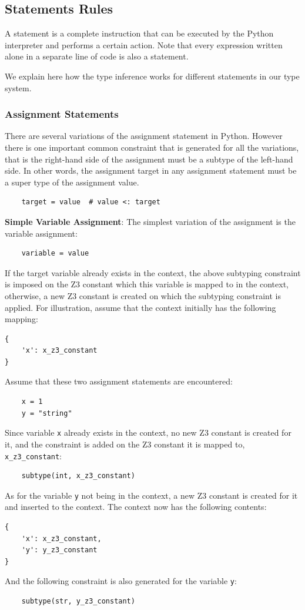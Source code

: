 \subsection{Statements Rules}
A statement is a complete instruction that can be executed by the Python interpreter and performs a certain action. Note that every expression written alone in a separate line of code is also a statement.

We explain here how the type inference works for different statements in our type system.

\subsubsection{Assignment Statements}
There are several variations of the assignment statement in Python. However there is one important common constraint that is generated for all the variations, that is the right-hand side of the assignment must be a subtype of the left-hand side. In other words, the assignment target in any assignment statement must be a super type of the assignment value.

\begin{lstlisting}
	target = value  # value <: target
\end{lstlisting}


\textbf{Simple Variable Assignment}: The simplest variation of the assignment is the variable assignment:
\begin{lstlisting}
	variable = value
\end{lstlisting}
If the target variable already exists in the context, the above subtyping constraint is imposed on the Z3 constant which this variable is mapped to in the context, otherwise, a new Z3 constant is created on which the subtyping constraint is applied. For illustration, assume that the context initially has the following mapping:
\begin{lstlisting}
{
	'x': x_z3_constant
}
\end{lstlisting}
Assume that these two assignment statements are encountered:
\begin{lstlisting}
	x = 1
	y = "string"
\end{lstlisting}
Since variable \lstinline|x| already exists in the context, no new Z3 constant is created for it, and the constraint is added on the Z3 constant it is mapped to, \lstinline|x_z3_constant|:
\begin{lstlisting}
	subtype(int, x_z3_constant)
\end{lstlisting}
As for the variable \lstinline|y| not being in the context, a new Z3 constant is created for it and inserted to the context. The context now has the following contents:
\begin{lstlisting}
{
	'x': x_z3_constant,
	'y': y_z3_constant
}
\end{lstlisting}
And the following constraint is also generated for the variable \lstinline|y|:
\begin{lstlisting}
	subtype(str, y_z3_constant)
\end{lstlisting}

